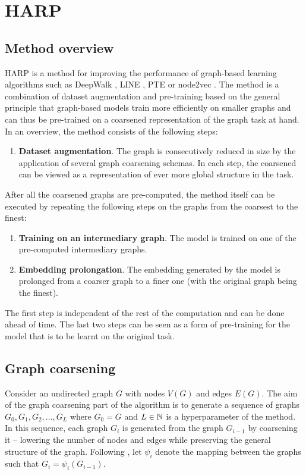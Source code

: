 \section{HARP}\label{sec:harp}

\subsection{Method overview}

HARP is a method for improving the performance of graph-based learning algorithms such as DeepWalk \cite{perozzi_deepwalk_2014}, LINE \cite{tang_line_2015}, PTE \cite{tang_pte_2015} or node2vec \cite{grover_node2vec_2016}. The method is a combination of dataset augmentation and pre-training based on the general principle that graph-based models train more efficiently on smaller graphs and can thus be pre-trained on a coarsened representation of the graph task at hand. In an overview, the method consists of the following steps:
\begin{enumerate}
  \item \textbf{Dataset augmentation}. The graph is consecutively reduced in size by the application of several graph coarsening schemas. In each step, the coarsened can be viewed as a representation of ever more global structure in the task.
\end{enumerate}
After all the coarsened graphs are pre-computed, the method itself can be executed by repeating the following steps on the graphs from the coarsest to the finest:
\begin{enumerate}[start=2]
  \item \textbf{Training on an intermediary graph}. The model is trained on one of the pre-computed intermediary graphs.
  \item \textbf{Embedding prolongation}. The embedding generated by the model is prolonged from a coarser graph to a finer one (with the original graph being the finest).
\end{enumerate}

The first step is independent of the rest of the computation and can be done ahead of time. The last two steps can be seen as a form of pre-training for the model that is to be learnt on the original task.

\subsection{Graph coarsening}\label{sec:graph-coarsening}
\sloppy Consider an undirected graph \( G \) with nodes \( V \left( G \right) \) and edges \( E \left( G \right) \). The aim of the graph coarsening part of the algorithm is to generate a sequence of graphs \( G_0, G_1, G_2, \dots, G_L \) where \( G_0 = G \) and \( L \in \mathbb{N} \) is a hyperparameter of the method. In this sequence, each graph \( G_i \) is generated from the graph \( G_{i - 1} \) by coarsening it -- lowering the number of nodes and edges while preserving the general structure of the graph. Following \cite{chen_harp_2018}, let \( \psi_i \) denote the mapping between the graphs such that \( G_i = \psi_i \left( G_{i - 1} \right) \).

